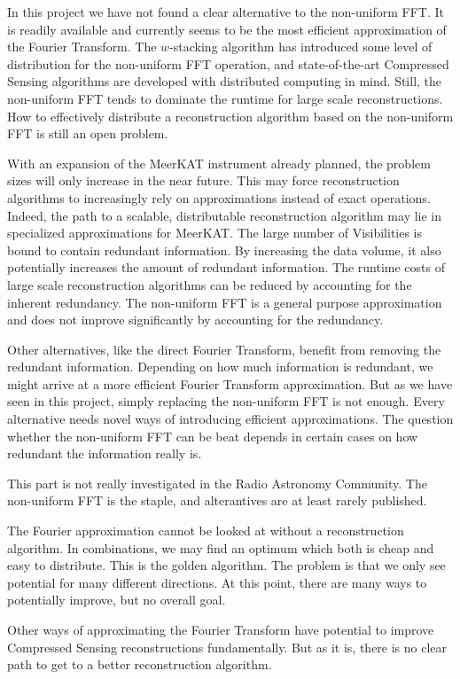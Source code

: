 In this project we have not found a clear alternative to the non-uniform FFT. It is readily available and currently seems to be the most efficient approximation of the Fourier Transform. The $w$-stacking algorithm\cite{offringa2014wsclean} has introduced some level of distribution for the non-uniform FFT operation, and state-of-the-art Compressed Sensing algorithms\cite{dabbech2018cygnus, pratley2018fast} are developed with distributed computing in mind. Still, the non-uniform FFT tends to dominate the runtime for large scale reconstructions. How to effectively distribute a reconstruction algorithm based on the non-uniform FFT is still an open problem.

With an expansion of the MeerKAT instrument already planned, the problem sizes will only increase in the near future. This may force reconstruction algorithms to increasingly rely on approximations instead of exact operations. Indeed, the path to a scalable, distributable reconstruction algorithm may lie in specialized approximations for MeerKAT. The large number of Visibilities is bound to contain redundant information. By increasing the data volume, it also potentially increases the amount of redundant information. The runtime costs of large scale reconstruction algorithms can be reduced by accounting for the inherent redundancy. The non-uniform FFT is a general purpose approximation\cite{kunisnonequispaced} and does not improve significantly by accounting for the redundancy.

Other alternatives, like the direct Fourier Transform, benefit from removing the redundant information. Depending on how much information is redundant, we might arrive at a more efficient Fourier Transform approximation. But as we have seen in this project, simply replacing the non-uniform FFT is not enough. Every alternative needs novel ways of introducing efficient approximations. The question whether the non-uniform FFT can be beat depends in certain cases on how redundant the information really is. 


This part is not really investigated in the Radio Astronomy Community. The non-uniform FFT is the staple, and alterantives are at least rarely published.

The Fourier approximation cannot be looked at without a reconstruction algorithm. In combinations, we may find an optimum which both is cheap and easy to distribute. This is the golden algorithm. The problem is that we only see potential for many different directions. At this point, there are many ways to potentially improve, but no overall goal.


Other ways of approximating the Fourier Transform have potential to improve Compressed Sensing reconstructions fundamentally. But as it is, there is no clear path to get to a better reconstruction algorithm. 






